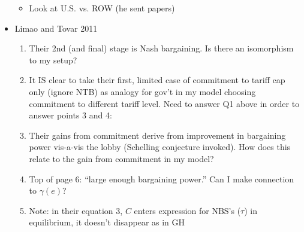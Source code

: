 \documentclass[12pt]{article}
\newcommand{\ga}{\gamma}
\begin{document}
\begin{itemize}
\begin{itemize}
			\item Look at U.S. vs. ROW (he sent papers)
		\end{itemize}
	\item Limao and Tovar 2011
		\begin{enumerate}
			\item Their 2nd (and final) stage is Nash bargaining. Is there an isomorphism to my setup?
			\item It IS clear to take their first, limited case of commitment to tariff cap only (ignore NTB) as analogy for gov't in my model choosing commitment to different tariff level. Need to answer Q1 above in order to answer points 3 and 4:
			\item Their gains from commitment derive from improvement in bargaining power vis-a-vis the lobby (Schelling conjecture invoked). How does this relate to the gain from commitment in my model?
			\item Top of page 6: ``large enough bargaining power.'' Can I make connection to $\ga(e)$?
			\item Note: in their equation 3, $C$ enters expression for NBS's ($\tau$) in equilibrium, it doesn't disappear as in GH
		\end{enumerate}
\end{itemize}
\end{document}
